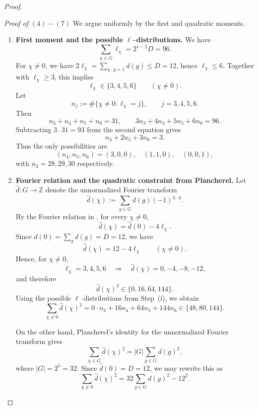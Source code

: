 \documentclass[10pt,a4paper]{amsart}
\begin{document}
\begin{proof}
\begin{enumerate}
\end{enumerate}



\noindent\textit{Proof of $(4)-(7)$} We argue uniformly by the first and quadratic moments.

\begin{enumerate}
\item[(i)] \textbf{First moment and the possible $\ell$--distributions.}
We have
\[
\sum_{\chi\in G}\ell_\chi = 2^{s-2}D = 96.
\]
For $\chi\neq 0$, we have $2\ell_\chi=\sum_{\chi\cdot g=1} d(g)\le D=12$, hence
$\ell_\chi\le 6$. Together with $\ell_\chi\ge 3$, this implies
\[
\ell_\chi\in\{3,4,5,6\}\qquad(\chi\neq 0).
\]
Let
\[
n_j:=\#\{\chi\neq 0:\ell_\chi=j\},\qquad j=3,4,5,6.
\]
Then
\[
n_3+n_4+n_5+n_6=31,
\qquad
3n_3+4n_4+5n_5+6n_6=96.
\]
Subtracting $3\cdot 31=93$ from the second equation gives
\[
n_4+2n_5+3n_6=3.
\]
Thus the only possibilities are
\[
(n_4,n_5,n_6)=(3,0,0),\quad (1,1,0),\quad (0,0,1),
\]
with $n_3=28,29,30$ respectively.

\item[(ii)] \textbf{Fourier relation and the quadratic constraint from Plancherel.}
Let $\widehat d:G\to\mathbb Z$ denote the unnormalized Fourier transform
\[
\widehat d(\chi):=\sum_{g\in G} d(g)(-1)^{\chi\cdot g}.
\]
By the Fourier relation in , for every $\chi\neq 0$,
\[
\widehat d(\chi)=\widehat d(0)-4\ell_\chi.
\]
Since $\widehat d(0)=\sum_g d(g)=D=12$, we have
\[
\widehat d(\chi)=12-4\ell_\chi
\qquad (\chi\neq 0).
\]
Hence, for $\chi\neq 0$,
\[
\ell_\chi=3,4,5,6 \quad\Longrightarrow\quad
\widehat d(\chi)=0,-4,-8,-12,
\]
and therefore
\[
\widehat d(\chi)^2\in\{0,16,64,144\}.
\]
Using the possible $\ell$--distributions from Step~(i), we obtain
\[
\sum_{\chi\neq 0}\widehat d(\chi)^2
=
0\cdot n_3 + 16n_4 + 64n_5 + 144n_6
\in\{48,80,144\}.
\]

On the other hand, Plancherel's identity for the unnormalized Fourier transform gives
\[
\sum_{\chi\in G}\widehat d(\chi)^2
=
|G|\sum_{g\in G} d(g)^2,
\]
where $|G|=2^5=32$. Since $\widehat d(0)=D=12$, we may rewrite this as
\begin{equation}\label{eq:nontriv-energy}
\sum_{\chi\neq 0}\widehat d(\chi)^2
=
32\sum_{g\in G} d(g)^2 - 12^2.
\end{equation}


\end{enumerate}
\end{proof}
\end{document}
